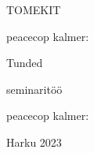 \begin{titlepage}
\par{TOMEKIT}
\vspace{0.3\textheight}
\par{peacecop kalmer:}
\LARGE
\par{Tunded}
\normalsize
\par{seminaritöö}
\vspace{0.3\textheight}
\begin{flushright}
\par{peacecop kalmer:}
\end{flushright}
		\vfill
Harku
\hfill
2023
\end{titlepage}
